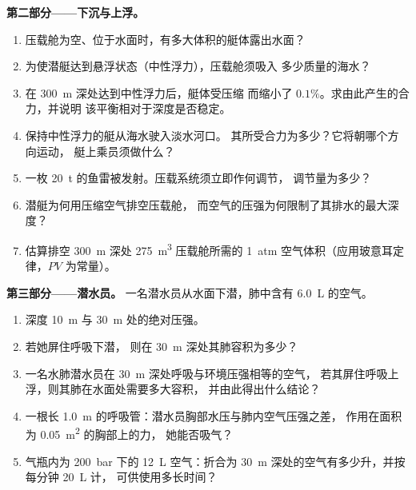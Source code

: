 \begin{problem}
\medskip
\noindent\textbf{第二部分——下沉与上浮。}
\begin{enumerate}[resume]
  \item 压载舱为空、位于水面时，有多大体积的艇体露出水面？
  \item 为使潜艇达到悬浮状态（中性浮力），压载舱须吸入
        多少质量的海水？
  \item 在 \qty{300}{m} 深处达到中性浮力后，艇体受压缩
        而缩小了 $0.1\%$。求由此产生的合力，并说明
        该平衡相对于深度是否稳定。
  \item 保持中性浮力的艇从海水驶入淡水河口。
        其所受合力为多少？它将朝哪个方向运动，
        艇上乘员须做什么？
  \item 一枚 \qty{20}{t} 的鱼雷被发射。压载系统须立即作何调节，
        调节量为多少？
  \item 潜艇为何用压缩空气排空压载舱，
        而空气的压强为何限制了其排水的最大深度？
  \item 估算排空 \qty{300}{m} 深处 \qty{275}{m^3} 压载舱所需的
        \qty{1}{atm} 空气体积（应用玻意耳定律，$PV$
        为常量）。
\end{enumerate}

\medskip
\noindent\textbf{第三部分——潜水员。}
一名潜水员从水面下潜，肺中含有 \qty{6.0}{L} 的空气。
\begin{enumerate}[resume]
  \item 深度 \qty{10}{m} 与 \qty{30}{m} 处的绝对压强。
  \item 若她屏住呼吸下潜，
        则在 \qty{30}{m} 深处其肺容积为多少？
  \item 一名水肺潜水员在 \qty{30}{m} 深处呼吸与环境压强相等的空气，
        若其屏住呼吸上浮，则其肺在水面处需要多大容积，
        并由此得出什么结论？
  \item 一根长 \qty{1.0}{m} 的呼吸管：潜水员胸部水压与肺内空气压强之差，
        作用在面积为 \qty{0.05}{m^2} 的胸部上的力，
        她能否吸气？
  \item 气瓶内为 \qty{200}{bar} 下的 \qty{12}{L} 空气：折合为
        \qty{30}{m} 深处的空气有多少升，并按每分钟 \qty{20}{L} 计，
        可供使用多长时间？
\end{enumerate}


\end{problem}

